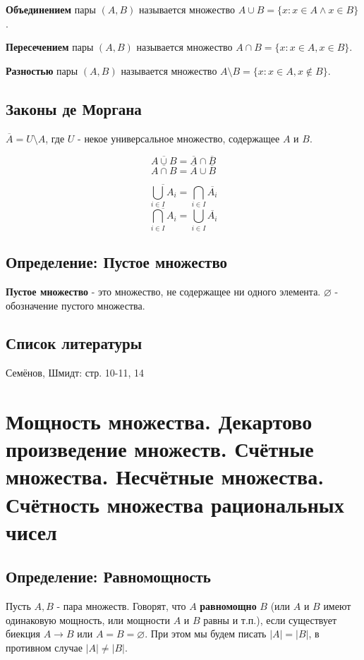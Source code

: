 \documentclass{article}
\begin{document}
\textbf{Объединением} пары $(A, B)$ называется множество $A \cup B = \{x : x \in A \wedge x \in B \}$.

\textbf{Пересечением} пары $(A, B)$ называется множество $A \cap B = \{x : x \in A, x \in B \}$.

\textbf{Разностью} пары $(A, B)$ называется множество $A \setminus B = \{x : x \in A, x \notin B \}$.

\subsection{Законы де Моргана}

$\overline A = U \setminus A$, где $U$ - некое универсальное множество, содержащее $A$ и $B$.

\[\overline{A \cup B} = \overline A \cap \overline B \]
\[\overline{A \cap B} = \overline A \cup \overline B \]

\[\overline{\bigcup_{i\in I} A_i} = \bigcap_{i\in I}\overline{A_i}\]
\[\overline{\bigcap_{i\in I} A_i} = \bigcup_{i\in I}\overline{A_i}\]

\subsection{Определение: Пустое множество}
\textbf{Пустое множество} - это множество, не содержащее ни одного элемента. $\varnothing$ - обозначение пустого множества.

\subsection*{Список литературы}
Семёнов, Шмидт: стр. 10-11, 14

\newpage
\section{Мощность множества. Декартово произведение множеств. Счётные множества. Несчётные множества. Счётность множества рациональных чисел}

\subsection{Определение: Равномощность}

Пусть $A, B$ - пара множеств. Говорят, что $A$ \textbf{равномощно} $B$ (или $A$ и $B$ имеют одинаковую мощность, или мощности $A$ и $B$ равны и т.п.), если существует биекция $A \rightarrow B$ или $A = B = \varnothing$. При этом мы будем писать $|A| = |B|$, в противном случае $|A|\neq|B|$.
\end{document}
